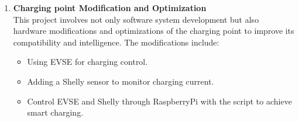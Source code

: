 \documentclass[
english,
ruledheaders=section,%
class=report,%
thesis={type=Report},%
accentcolor=9c,%
custommargins=true,%
marginpar=false,%
parskip=half-,%
fontsize=11pt,%
logofile={img/tuda_logo.pdf}, %
]{tudapub}
\begin{document}
\begin{enumerate}
            \item \textbf{Charging point Modification and Optimization}\\
            This project involves not only software system development but also hardware modifications and optimizations of the charging point to improve its compatibility and intelligence. The modifications include:
            \begin{itemize}
                \item Using EVSE for charging control.
                \item Adding a Shelly sensor to monitor charging current.
                \item Control EVSE and Shelly through RaspberryPi with the script to achieve smart charging.
            \end{itemize}
        \end{enumerate}
\end{document}
